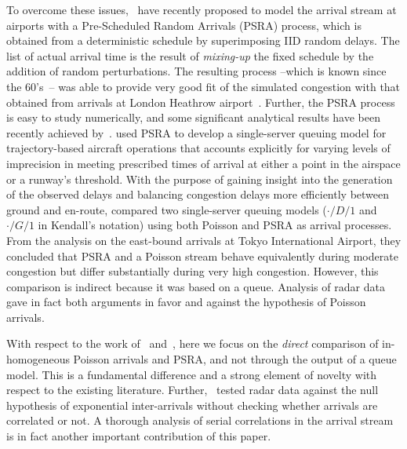 \documentclass[final,review]{elsarticle}
\begin{document}
To overcome these issues,~\citet{guadagni2011queueing} have recently proposed to model the arrival stream at airports with a Pre-Scheduled Random Arrivals (\ac{PSRA}) process, which is obtained from a deterministic schedule by superimposing \ac{IID} random delays.
The list of actual arrival time is the result of \emph{mixing-up} the fixed schedule by the addition of random perturbations.
The resulting process --which is known since the 60's~\citep{Kendall1964}-- was able to provide very good fit of the simulated congestion with that obtained from arrivals at London Heathrow airport~\citep{caccavale2014model}.
Further, the \ac{PSRA} process is easy to study numerically, and some significant analytical results have been recently achieved by~\citet{lancia2013advances}.
\citet{nikoleris2012queueing} used \ac{PSRA} to develop a single-server queuing model for trajectory-based aircraft operations that accounts explicitly for varying levels of imprecision in meeting prescribed times of arrival at either a point in the airspace or a runway's threshold.
With the purpose of gaining insight into the generation of the observed delays and balancing congestion delays more efficiently between ground and en-route, \citet{gwiggner2014data} compared two single-server queuing models (\(\cdot/D/1\) and \(\cdot/G/1\) in Kendall's notation) using both Poisson and \ac{PSRA} as arrival processes.
From the analysis on the east-bound arrivals at Tokyo International Airport, they concluded that \ac{PSRA} and a Poisson stream behave equivalently during moderate congestion but differ substantially during very high congestion.
However, this comparison is indirect because it was based on a queue.
Analysis of radar data gave in fact both arguments in favor and against the hypothesis of Poisson arrivals.

With respect to the work of~\citep{caccavale2014model} and~\citet{gwiggner2014data}, here we focus on the \emph{direct} comparison of in-homogeneous Poisson arrivals and \ac{PSRA}, and not through the output of a queue model.
This is a fundamental difference and a strong element of novelty with respect to the existing literature.
Further,~\citet{gwiggner2014data} tested radar data against the null hypothesis of exponential inter-arrivals without checking whether arrivals are correlated or not.
A thorough analysis of serial correlations in the arrival stream is in fact another important contribution of this paper.
\end{document}

